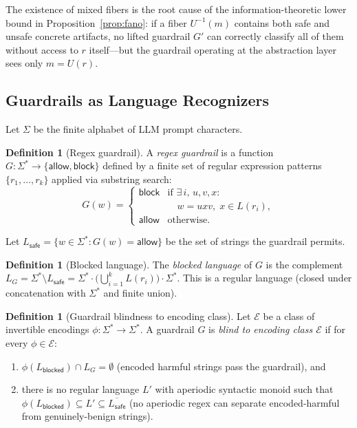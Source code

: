 \documentclass[letterpaper,twocolumn,10pt]{article}
\theoremstyle{definition}
\newtheorem{definition}[theorem]{Definition}
\theoremstyle{remark}
\begin{document}
The existence of mixed fibers is the root cause of the information-theoretic lower
bound in Proposition~\ref{prop:fano}: if a fiber $U^{-1}(m)$ contains both safe
and unsafe concrete artifacts, no lifted guardrail $G'$ can correctly classify all
of them without access to $r$ itself---but the guardrail operating at the
abstraction layer sees only $m = U(r)$.

\subsection{Guardrails as Language Recognizers}\label{sec:guardrail-language}

Let $\Sigma$ be the finite alphabet of LLM prompt characters.

\begin{definition}[Regex guardrail]\label{def:regex-guardrail}
A \emph{regex guardrail} is a function $G\colon \Sigma^* \to \{\mathsf{allow}, \mathsf{block}\}$
defined by a finite set of regular expression patterns $\{r_1, \ldots, r_k\}$
applied via substring search:
\[
  G(w) = \begin{cases}
    \mathsf{block} & \text{if } \exists\, i,\, u,v,x:\\
                   & \quad w = u x v,\; x \in L(r_i), \\
    \mathsf{allow} & \text{otherwise.}
  \end{cases}
\]
\end{definition}

Let $L_{\mathsf{safe}} = \{w \in \Sigma^* : G(w) = \mathsf{allow}\}$ be the set of
strings the guardrail permits.

\begin{definition}[Blocked language]\label{def:blocked-language}
The \emph{blocked language} of $G$ is the complement
$L_G = \Sigma^* \setminus L_{\mathsf{safe}} = \Sigma^* \cdot \bigl(\bigcup_{i=1}^{k} L(r_i)\bigr) \cdot \Sigma^*$.
This is a regular language (closed under concatenation with $\Sigma^*$ and finite union).
\end{definition}

\begin{definition}[Guardrail blindness to encoding class]\label{def:blindness}
Let $\mathcal{E}$ be a class of invertible encodings $\phi\colon \Sigma^* \to \Sigma^*$.
A guardrail $G$ is \emph{blind to encoding class $\mathcal{E}$} if for every
$\phi \in \mathcal{E}$:
\begin{enumerate}
  \item $\phi(L_{\mathsf{blocked}}) \cap L_G = \emptyset$ (encoded harmful strings
    pass the guardrail), and
  \item there is no regular language $L'$ with aperiodic syntactic monoid such that
    $\phi(L_{\mathsf{blocked}}) \subseteq L' \subseteq \overline{L_{\mathsf{safe}}}$
    (no aperiodic regex can separate encoded-harmful from genuinely-benign strings).
\end{enumerate}
\end{definition}
\end{document}
